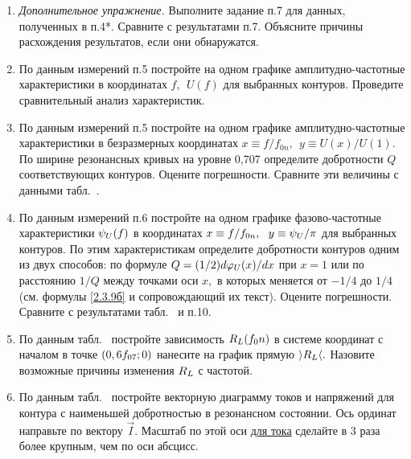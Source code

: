 \begin{lab:task}
\begin{enumerate}
Оцените относительный вклад активных потерь в конденсаторах, представленных в табл.~. сопротивлением $R_{\sc{S}\text{max}},$ рассчитанным для максимального значения $\tg\delta=10^{-3},$ в суммарное активное сопротивление контура.

\item \emph{Дополнительное упражнение.} Выполните задание п.7 для данных, полученных в п.4*. Сравните с результатами п.7. Объясните причины расхождения результатов, если они обнаружатся.

\item По данным измерений п.5 постройте на одном графике амплитудно-частотные характеристики в координатах $f,~~U(f)$   для выбранных контуров. Проведите сравнительный анализ характеристик.

\item По данным измерений п.5 постройте на одном графике амплитудно-частотные характеристики в безразмерных координатах $x\equiv f/f_{0n},~~y\equiv U(x)/U(1).$ По ширине резонансных кривых на уровне 0,707 определите добротности $Q$ соответствующих контуров. Оцените погрешности. Сравните эти величины с данными табл.~.

\item По данным измерений п.6 постройте на одном графике фазово-частотные характеристики $\psi_{\sc{U}}(f)$ в координатах $x\equiv f/f_{0n},~~y\equiv\psi_{\sc{U}}/\pi$ для выбранных контуров. По этим характеристикам определите добротности контуров одним из двух способов: по формуле $Q=(1/2)d\varphi_{\sc{U}}(x)/dx$ при $x=1$ или по расстоянию $1/Q$ между точками оси $x,$ в которых  меняется от $-1/4$ до $1/4$ (см. формулы \eqref{2.3.9б} и сопровождающий их текст). Оцените погрешности. Сравните с результатами табл.~ и п.10.

\item По данным табл.~ постройте зависимость $R_{\sc{L}}(f_{\sc{0}}n)$ в системе координат с началом в точке $(0,6f_{\sc{07}};0)$ нанесите на график прямую $\rangle R_{\sc{L}}\langle .$ Назовите возможные причины изменения $R_{\sc{L}}$ с частотой.

\item По данным табл.~ постройте векторную диаграмму токов и напряжений для контура с наименьшей добротностью в резонансном состоянии. Ось ординат направьте по вектору $\vec I.$ Масштаб по этой оси \underline{для тока} сделайте в 3 раза более крупным, чем по оси абсцисс.
	\end{enumerate}
\end{lab:task}

